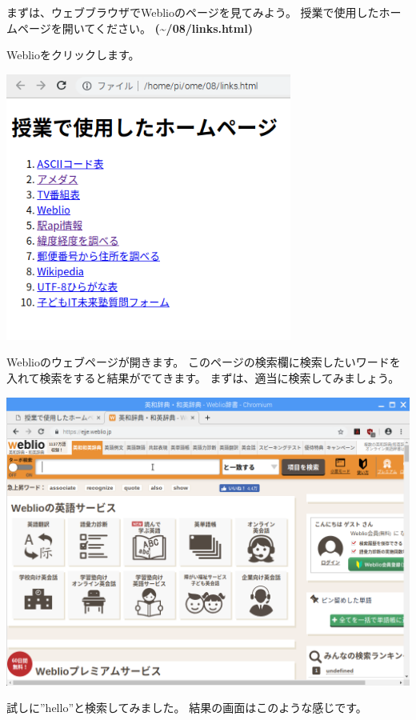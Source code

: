 \documentclass[a4paper,12pt,dvipdfmx]{jarticle}
\begin{document}
まずは、ウェブブラウザでWeblioのページを見てみよう。
授業で使用したホームページを開いてください。
\textbf{({\textasciitilde}/08/links.html)}

Weblioをクリックします。



\begin{center}
\includegraphics[width=9.398cm]{textbook-img017.png}

\end{center}


\bigskip


\bigskip

Weblioのウェブページが開きます。
このページの検索欄に検索したいワードを入れて検索をすると結果がでてきます。
まずは、適当に検索してみましょう。



\begin{center}
\includegraphics[width=17.006cm]{textbook-img045.png}

\end{center}
\clearpage
試しに”hello”と検索してみました。
結果の画面はこのような感じです。
\end{document}
